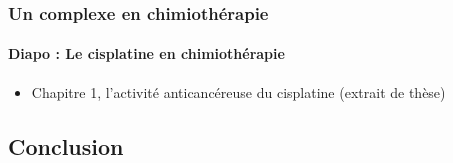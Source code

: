 \subsubsection{Un complexe en chimiothérapie}

\paragraph{Diapo : Le cisplatine en chimiothérapie}
\begin{itemize}
\item Chapitre 1, l'activité anticancéreuse du cisplatine (extrait de thèse)
\end{itemize}

\subsection{Conclusion}
